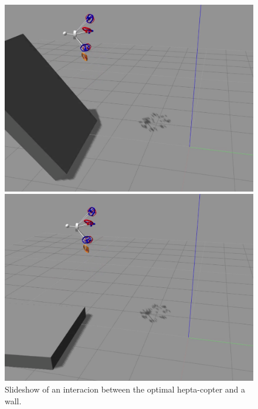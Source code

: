 \begin{figure}[!ht]
\begin{center}
\begin{minipage}[t]{0.495\textwidth}
      \includegraphics[width=\linewidth]{images/Selection_024.png}
    \end{minipage}
    \hfill
    \begin{minipage}[t]{0.495\textwidth}
      \includegraphics[width=\linewidth]{images/Selection_026.png}
    \end{minipage}
    \caption{Slideshow of an interacion between the optimal hepta-copter and a wall.}
    \label{fig:hepta_sim}
  \end{center}
\end{figure}
